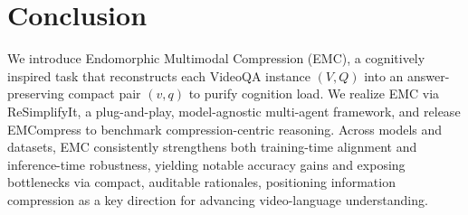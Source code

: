 \section{Conclusion}
\vspace{-0.4em}
We introduce Endomorphic Multimodal Compression (EMC), a cognitively inspired task that reconstructs each VideoQA instance $(V, Q)$ into an answer-preserving compact pair $(v, q)$ to purify cognition load. We realize EMC via ReSimplifyIt, a plug-and-play, model-agnostic multi-agent framework, and release EMCompress to benchmark compression-centric reasoning. Across models and datasets, EMC consistently strengthens both training-time alignment and inference-time robustness, yielding notable accuracy gains and exposing bottlenecks via compact, auditable rationales, positioning information compression as a key direction for advancing video-language understanding.
